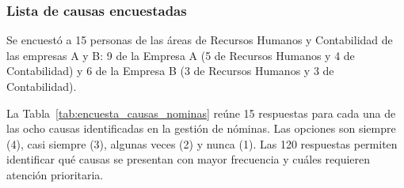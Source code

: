 \subsubsection{Lista de causas encuestadas}

Se encuestó a 15 personas de las áreas de Recursos Humanos y Contabilidad de las empresas A y B: 
9 de la Empresa A (5 de Recursos Humanos y 4 de Contabilidad) y 6 de la Empresa B (3 de Recursos Humanos y 3 de Contabilidad).

La Tabla~\ref{tab:encuesta_causas_nominas} reúne 15 respuestas para cada una de las ocho causas identificadas en la gestión de nóminas. 
Las opciones son siempre (4), casi siempre (3), algunas veces (2) y nunca (1). 
Las 120 respuestas permiten identificar qué causas se presentan con mayor frecuencia y cuáles requieren atención prioritaria.

